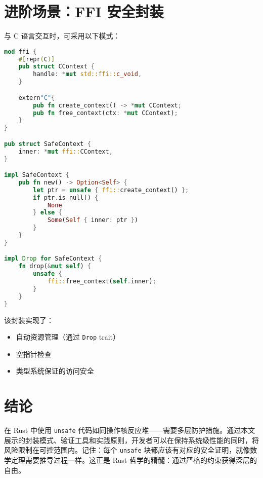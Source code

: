 \chapter{进阶场景：FFI 安全封装}
与 C 语言交互时，可采用以下模式：\par
\begin{lstlisting}[language=rust]
mod ffi {
    #[repr(C)]
    pub struct CContext {
        handle: *mut std::ffi::c_void,
    }

    extern"C"{
        pub fn create_context() -> *mut CContext;
        pub fn free_context(ctx: *mut CContext);
    }
}

pub struct SafeContext {
    inner: *mut ffi::CContext,
}

impl SafeContext {
    pub fn new() -> Option<Self> {
        let ptr = unsafe { ffi::create_context() };
        if ptr.is_null() {
            None
        } else {
            Some(Self { inner: ptr })
        }
    }
}

impl Drop for SafeContext {
    fn drop(&mut self) {
        unsafe {
            ffi::free_context(self.inner);
        }
    }
}
\end{lstlisting}
该封装实现了：\par
\begin{itemize}
\item 自动资源管理（通过 \verb!Drop! trait）
\item 空指针检查
\item 类型系统保证的访问安全
\end{itemize}
\chapter{结论}
在 Rust 中使用 \verb!unsafe! 代码如同操作核反应堆——需要多层防护措施。通过本文展示的封装模式、验证工具和实践原则，开发者可以在保持系统级性能的同时，将风险限制在可控范围内。记住：每个 \verb!unsafe! 块都应该有对应的安全证明，就像数学定理需要推导过程一样。这正是 Rust 哲学的精髓：通过严格的约束获得深层的自由。\par
